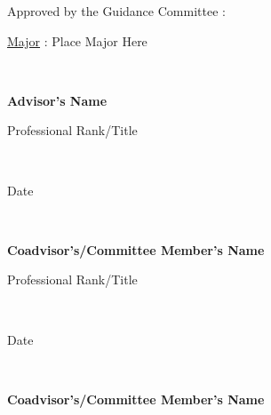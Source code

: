 \small

Approved by the Guidance Committee :

\vspace{.25cm}

\underline{Major} : Place Major Here


\hspace{4.5cm} \hrulefill\

\vspace{-0.5cm}

\hspace{4.5cm} 
\textbf{Advisor's Name}

\vspace{-.5cm}

\hspace{4.5cm} Professional Rank/Title

\vspace{-0.25cm}

\hspace{4.5cm} \hrulefill\

\vspace{-0.5cm}

\hspace{4.5cm}
Date

\hspace{4.5cm} \hrulefill\

\vspace{-0.5cm}

\hspace{4.5cm}
\textbf{Coadvisor's/Committee Member's Name}

\vspace{-.5cm}

\hspace{4.5cm} Professional Rank/Title

\vspace{-0.25cm}

\hspace{4.5cm} \hrulefill\

\vspace{-0.5cm}

\hspace{4.5cm}
Date

\hspace{4.5cm} \hrulefill\

\vspace{-0.5cm}

\hspace{4.5cm}
\textbf{Coadvisor's/Committee Member's Name}

